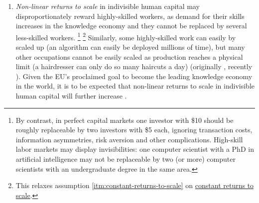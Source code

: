 \begin{enumerate}
	\item {} \label{itm:non-linear-returns} \emph{Non-linear returns to scale} in indivisible human capital may disproportionately reward highly-skilled workers, as demand for their skills increases in the knowledge economy and they cannot be replaced by several less-skilled workers.
	\footnote{
		By contrast, in perfect capital markets one investor with \$10 should be roughly replaceable by two investors with \$5 each, ignoring transaction costs, information asymmetries, risk aversion and other complications.
		High-skill labor markets may display invisibilities:
		one computer scientist with a PhD in artificial intelligence may not be replaceable by two (or more) computer scientists with an undergraduate degree in the same area.
	}
	\footnote{
		This relaxes  assumption \ref{itm:constant-returns-to-scale} on \hyperref[itm:constant-returns-to-scale]{constant returns to scale}.
	}
	Similarly, some highly-skilled work can easily by scaled up (an algorithm can  easily be deployed millions of time), but many other occupations cannot be easily scaled as production reaches a physical limit (a hairdresser can only do so many haircuts a day) (originally \citealt{Rosen1981}, recently \citealt{Taleb2007}).
Given the \gls{EU}'s proclaimed goal to become the leading knowledge economy in the world, it is to be expected that non-linear returns to scale in indivisible human capital will further increase \citep{Commission2007}.


\end{enumerate}
